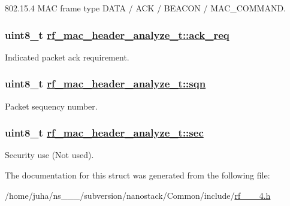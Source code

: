 802.15.4 MAC frame type DATA / ACK / BEACON / MAC\_\-COMMAND. \hypertarget{structrf__mac__header__analyze__t_4fe82df93230eef5db2a4f335f726e52}{
\subsubsection[ack\_\-req]{\setlength{\rightskip}{0pt plus 5cm}uint8\_\-t \hyperlink{structrf__mac__header__analyze__t_4fe82df93230eef5db2a4f335f726e52}{rf\_\-mac\_\-header\_\-analyze\_\-t::ack\_\-req}}}
\label{structrf__mac__header__analyze__t_4fe82df93230eef5db2a4f335f726e52}


Indicated packet ack requirement. \hypertarget{structrf__mac__header__analyze__t_9697d7e7a2305dccac3af80253c02894}{
\subsubsection[sqn]{\setlength{\rightskip}{0pt plus 5cm}uint8\_\-t \hyperlink{structrf__mac__header__analyze__t_9697d7e7a2305dccac3af80253c02894}{rf\_\-mac\_\-header\_\-analyze\_\-t::sqn}}}
\label{structrf__mac__header__analyze__t_9697d7e7a2305dccac3af80253c02894}


Packet sequency number. \hypertarget{structrf__mac__header__analyze__t_101f756d24f219d91e70d6f2f402e0d3}{
\subsubsection[sec]{\setlength{\rightskip}{0pt plus 5cm}uint8\_\-t \hyperlink{structrf__mac__header__analyze__t_101f756d24f219d91e70d6f2f402e0d3}{rf\_\-mac\_\-header\_\-analyze\_\-t::sec}}}
\label{structrf__mac__header__analyze__t_101f756d24f219d91e70d6f2f402e0d3}


Security use (Not used). 

The documentation for this struct was generated from the following file:\begin{CompactItemize}
\item 
/home/juha/ns\_\_\_/subversion/nanostack/Common/include/\hyperlink{rf__802__15__4_8h}{rf\_\_\_\-4.h}\end{CompactItemize}
